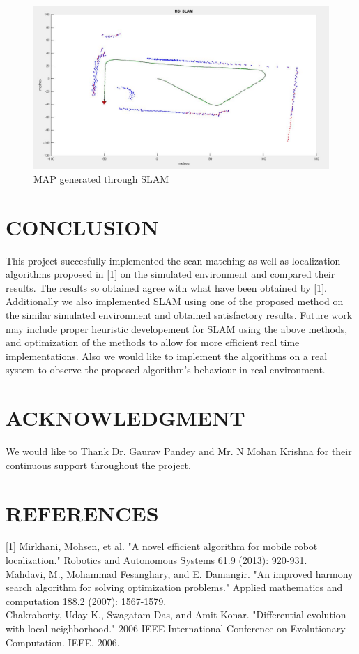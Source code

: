 \documentclass[letterpaper, 10 pt, conference]{ieeeconf}  %
\begin{document}
\begin{figure}[H]
  \includegraphics[width=\linewidth]{slam2.jpg}
  \caption{MAP generated through SLAM}
  \label{fig:dataset}
\end{figure}


\section{CONCLUSION}
This project succesfully implemented the scan matching as well as localization algorithms proposed in [1] on the simulated environment and compared their results. The results so obtained agree with what have been obtained by [1]. Additionally we also implemented SLAM using one of the proposed method on the similar simulated environment and obtained satisfactory results. Future work may include proper heuristic developement for SLAM using the above methods, and optimization of the methods to allow for more efficient real time implementations. Also we would like to implement the algorithms on a real system to observe the proposed algorithm's behaviour in real environment.

\section{ACKNOWLEDGMENT}
We would like to Thank Dr. Gaurav Pandey and Mr. N Mohan Krishna for their continuous support throughout the project.

\section{REFERENCES}
[1] Mirkhani, Mohsen, et al. "A novel efficient algorithm for mobile robot localization." Robotics and Autonomous Systems 61.9 (2013): 920-931.\\
\indent [2] Mahdavi, M., Mohammad Fesanghary, and E. Damangir. "An improved harmony search algorithm for solving optimization problems." Applied mathematics and computation 188.2 (2007): 1567-1579.\\
\indent [3] Chakraborty, Uday K., Swagatam Das, and Amit Konar. "Differential evolution with local neighborhood." 2006 IEEE International Conference on Evolutionary Computation. IEEE, 2006.
\end{document}
